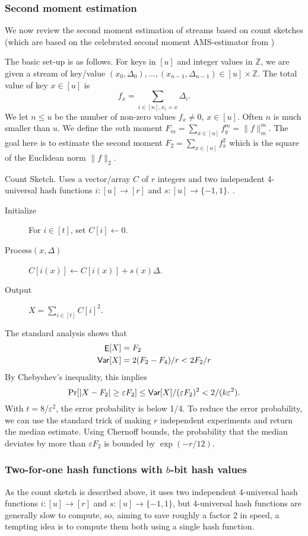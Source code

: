 \documentclass[12pt]{article}
\DeclareMathOperator*{\E}{\sf{E}}
\newcommand{\Var}{{\sf Var}}
\newcommand\eps\varepsilon
\newcommand\fct\rightarrow
\newcommand\asgn\leftarrow
\newcommand\Z{\mathbb Z}
\begin{document}
\subsubsection{Second moment estimation}
We now review the second moment estimation of streams based on count
sketches \cite{charikar04count-sketch} (which are based on the
celebrated second moment AMS-estimator from \cite{alon96frequency})

The basic set-up is as follows.  For keys in $[u]$ and integer values in $\Z$, we are given a stream of key/value $(x_0,\Delta_0),\ldots, (x_{n-1},\Delta_{n-1})\in [u]\times\Z$. The
total value of key $x\in[u]$ is
\[f_x=\sum_{i\in[n],x_i=x} \Delta_i.\]
We let $n\leq u$ be  the number of non-zero values
$f_x\neq 0$, $x\in [u]$. Often $n$ is much smaller than $u$.
We define the $m$th moment
$F_m=\sum_{x\in [u]}f_y^m=\|f\|_m^m$. The goal here is to
estimate the second moment $F_2=\sum_{x\in [u]}f_x^2$ which is the square of the Euclidean norm $\|f\|_2$. 

\begin{algorithm}
  \caption{\label{alg:count-sketch} Count Sketch. Uses a
vector/array $C$ of $r$ integers and two independent
4-universal hash functions $i:[u]\fct[r]$ and $s:[u]\fct\{-1,1\}$.
.}
\begin{description}
\item[Initialize] For $i\in[t]$, set $C[i]\asgn 0$.
\item[Process$(x,\Delta)$] $C[i(x)]\asgn C[i(x)]+s(x) \Delta$. 
\item[Output] $X=\sum_{i\in[t]} C[i]^2$.
\end{description}
\end{algorithm}
The standard analysis \cite{charikar04count-sketch} shows that 
\begin{align}
\E[X]&=F_2\label{eq:E-F2}\\
\Var[X]&=2(F_2-F_4)/r<2F_2/r\label{eq:V-F2}
\end{align}
By Chebyshev's inequality, this implies
\[\Pr[|X-F_2|\geq \eps F_2]\leq \Var[X]/(\eps F_2)^2<
2/(k\eps^2).\]
With $t=8/\eps^2$, the error probability is below 1/4.
To
reduce the error probability, we can use the standard trick of
making $r$ independent experiments
and return the median estimate. Using Chernoff bounds, the probability
that the median deviates by more than $\eps F_2$ is bounded by
$\exp(-r/12)$.

\subsubsection{Two-for-one hash functions with $b$-bit hash values}
As the count sketch is described above,
it uses two independent 4-universal hash functions
$i:[u]\fct[r]$ and $s:[u]\fct\{-1,1\}$, but 4-universal hash functions
are generally slow to compute, so, aiming to save roughly a factor 2
in speed, a tempting idea is to compute them both using a single hash
function.
\end{document}

